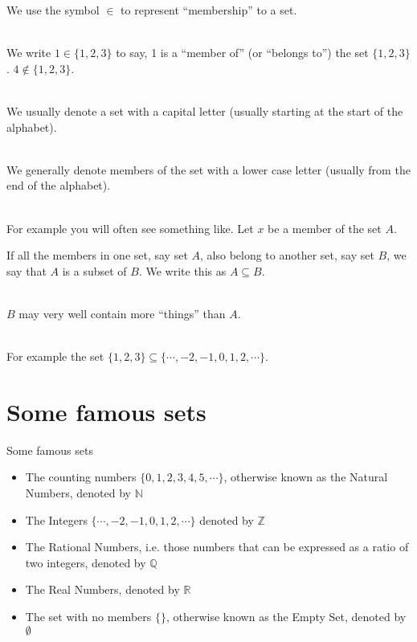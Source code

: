 \documentclass{beamer}
\begin{document}
\begin{frame}
    We use the symbol $\in$ to represent ``membership'' to a set. \\~\

    We write $1 \in \{1,2,3\}$ to say, 1 is a ``member of'' (or ``belongs to'')
    the set $\{1, 2, 3\}$. $4 \notin \{1,2,3\}$. \\~\

    We usually denote a set with a capital letter (usually starting at the start of the alphabet). \\~\

    We generally denote members of the set with a lower case letter (usually from the end of the alphabet). \\~\

    For example you will often see something like. Let $x$ be a member of the set $A$.
\end{frame}

\begin{frame}
    If all the members in one set, say set $A$, also belong to another set, say set $B$,
    we say that $A$ is a subset of $B$. We write this as $A \subseteq B$. \\~\

    $B$ may very well contain more ``things'' than $A$. \\~\

    For example the set $\{1,2,3\} \subseteq \{\cdots, -2, -1,0,1,2,\cdots\}.$
\end{frame}

\section{Some famous sets}

\begin{frame}{Some famous sets}
    \begin{itemize}
        \item The counting numbers $\{0, 1, 2, 3, 4, 5, \cdots\}$,
              otherwise known as the Natural Numbers, denoted by $\mathbb{N}$
        \item The Integers $\{\cdots, -2, -1, 0, 1, 2, \cdots\}$ denoted by $\mathbb{Z}$
        \item The Rational Numbers, i.e. those numbers that can be expressed as a ratio of two integers, denoted by $\mathbb{Q}$
        \item The Real Numbers, denoted by $\mathbb{R}$
        \item The set with no members $\{\}$, otherwise known as the Empty Set, denoted by $\emptyset$
    \end{itemize}
\end{frame}
\end{document}
